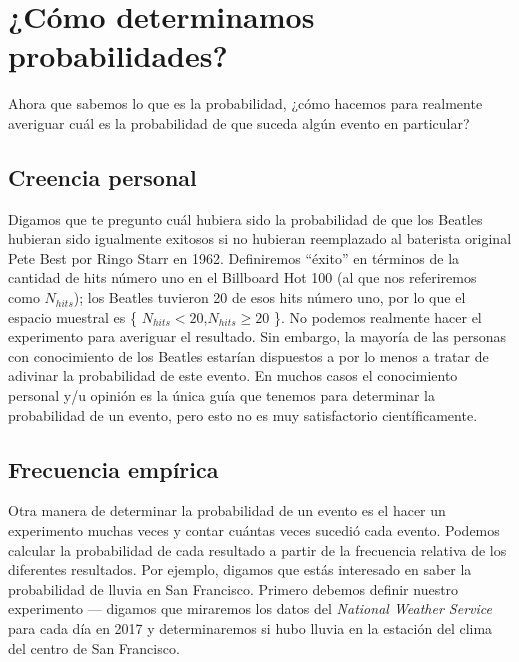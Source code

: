 \documentclass[
  12pt,
]{book}
\theoremstyle{definition}
\theoremstyle{definition}
\theoremstyle{definition}
\theoremstyle{remark}
\begin{document}
\hypertarget{cuxf3mo-determinamos-probabilidades}{%
\section{¿Cómo determinamos probabilidades?}\label{cuxf3mo-determinamos-probabilidades}}

Ahora que sabemos lo que es la probabilidad, ¿cómo hacemos para realmente averiguar cuál es la probabilidad de que suceda algún evento en particular?

\hypertarget{creencia-personal}{%
\subsection{Creencia personal}\label{creencia-personal}}

Digamos que te pregunto cuál hubiera sido la probabilidad de que los Beatles hubieran sido igualmente exitosos si no hubieran reemplazado al baterista original Pete Best por Ringo Starr en 1962. Definiremos ``éxito'' en términos de la cantidad de hits número uno en el Billboard Hot 100 (al que nos referiremos como \(N_{hits}\)); los Beatles tuvieron 20 de esos hits número uno, por lo que el espacio muestral es \{ \(N_{hits} < 20\),\(N_{hits} \ge 20\) \}. No podemos realmente hacer el experimento para averiguar el resultado. Sin embargo, la mayoría de las personas con conocimiento de los Beatles estarían dispuestos a por lo menos a tratar de adivinar la probabilidad de este evento. En muchos casos el conocimiento personal y/u opinión es la única guía que tenemos para determinar la probabilidad de un evento, pero esto no es muy satisfactorio científicamente.

\hypertarget{empirical-frequency}{%
\subsection{Frecuencia empírica}\label{empirical-frequency}}

Otra manera de determinar la probabilidad de un evento es el hacer un experimento muchas veces y contar cuántas veces sucedió cada evento. Podemos calcular la probabilidad de cada resultado a partir de la frecuencia relativa de los diferentes resultados. Por ejemplo, digamos que estás interesado en saber la probabilidad de lluvia en San Francisco. Primero debemos definir nuestro experimento --- digamos que miraremos los datos del \emph{National Weather Service} para cada día en 2017 y determinaremos si hubo lluvia en la estación del clima del centro de San Francisco.
\end{document}
